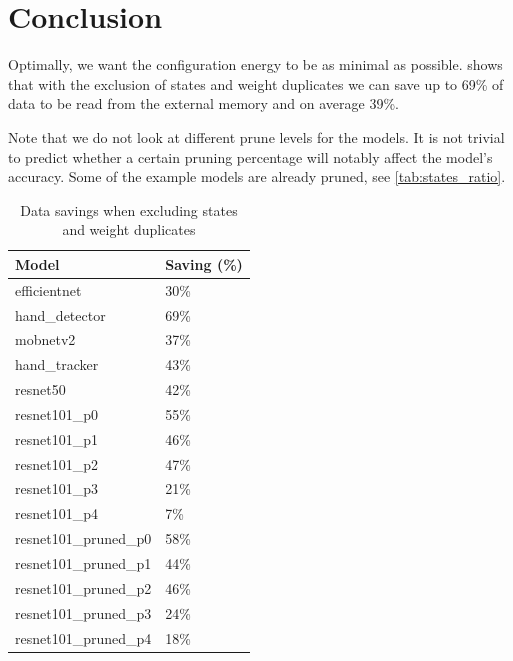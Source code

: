 \section{Conclusion}
Optimally, we want the configuration energy to be as minimal as possible.
 shows that with the exclusion of states and weight duplicates we can save up to 69\% of data to be read from the external memory and on average 39\%.

Note that we do not look at different prune levels for the models.
It is not trivial to predict whether a certain pruning percentage will notably affect the model's accuracy.
Some of the example models are already pruned, see \cref{tab:states_ratio}.

\begin{table}[hbtp]
\centering
\begin{tabular}{@{}ll@{}}
\toprule
\textbf{Model}          & \textbf{Saving (\%)} \\ \midrule
efficientnet            & 30\%                 \\
hand\_detector          & 69\%                 \\
mobnetv2                & 37\%                 \\
hand\_tracker           & 43\%                 \\
resnet50                & 42\%                 \\
resnet101\_p0           & 55\%                 \\
resnet101\_p1           & 46\%                 \\
resnet101\_p2           & 47\%                 \\
resnet101\_p3           & 21\%                 \\
resnet101\_p4           & 7\%                  \\
resnet101\_pruned\_p0   & 58\%                 \\
resnet101\_pruned\_p1   & 44\%                 \\
resnet101\_pruned\_p2   & 46\%                 \\
resnet101\_pruned\_p3   & 24\%                 \\
resnet101\_pruned\_p4   & 18\%                 \\ \bottomrule
\end{tabular}
\caption{Data savings when excluding states and weight duplicates}
\label{tab:savings}
\end{table}

